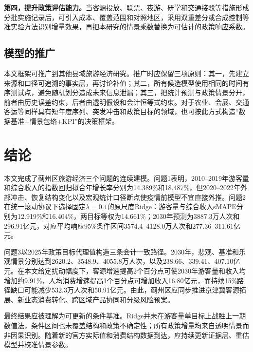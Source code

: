 \documentclass[withoutpreface,bwprint]{cumcmthesis}
\begin{document}
\textbf{第四，提升政策评估能力。}当客源投放、联票、夜游、研学和交通接驳等措施形成分批实施记录后，可引入成本、覆盖范围和对照地区，采用双重差分或合成控制等准实验方法识别增量效果，再把本研究的情景乘数替换为可估计的政策响应系数。

\subsection{模型的推广}

本文框架可推广到其他县域旅游经济研究。推广时应保留三项原则：其一，先建立来源和口径可追溯的事实层，再讨论补值；其二，所有候选模型使用相同的时间有序测试点，避免随机划分造成未来信息泄漏；其三，把统计预测与政策情景分开，前者由历史误差约束，后者由透明假设和会计恒等式约束。对于农业、会展、交通客运等同样具有短年度序列、突发冲击和政策目标的领域，也可按此方式构造“数据基准+情景包络+KPI”的决策框架。

\section{结论}

本文完成了蓟州区旅游经济三个问题的连续建模。问题1表明，2010--2019年游客量和综合收入的指数回归拟合年增长率分别为14.389\%和18.487\%，但2020--2022年外部冲击、恢复结构变化以及宏观统计口径断点使疫情前模型不宜直接外推。问题2在统一滚动协议下选择固定$\lambda=0.1$的原尺度Ridge：游客量与综合收入sMAPE分别为12.919\%和16.404\%，两目标等权为14.661\%；2030年预测为3887.3万人次和296.91亿元，对应平均响应95\%条件区间3574.4--4128.0万人次和277.36--311.61亿元。

问题3以2025年政策目标代理值构造三条会计一致路径。2030年，悲观、基准和乐观情景分别达到2620.2、3548.9、4055.8万人次，以及238.66、339.41、407.10亿元。在本文给定扰动幅度下，客源增速提高2个百分点可使2030年游客量和收入均增加约9.91\%，人均消费增速提高1个百分点可增加收入16.80亿元，而持续15\%路径缺口可能减少532.3万人次和50.91亿元。由此，蓟州区应同步推进京津冀客源拓展、新业态消费转化、跨区域产品协同和分级风险预案。

最终结果应被理解为可更新的条件基准。Ridge并未在游客量单目标上战胜上一期数值法，条件区间也未覆盖结构和政策不确定性；所有政策增量均来自透明情景而非因果识别。随着新的官方实际值和消费结构数据到达，应持续更新证据层、重估模型并校准情景参数。

\newpage
\nocite{untourism2024barometer,jiao2025ismmicmac,jin2024highquality,wu2024coupling}
\end{document}

